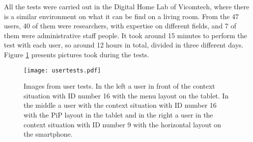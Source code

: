 All the tests were carried out in the Digital Home Lab of Vicomtech, where there is a similar environment on what it can be find on a living room. From the 47 users, 40 of them were researchers, with expertise on different fields, and 7 of them were administrative staff people. It took around 15 minutes to perform the test with each user, so around 12 hours in total, divided in three different days. Figure \ref{fig:usertestsBMSB15} presents pictures took during the tests.
\begin{figure}
	\centering
	\texttt{[image: usertests.pdf]}
	\caption[User tests images]{Images from user tests. In the left a user in front of the context situation with ID number 16 with the menu layout on the tablet. In the middle a user with the context situation with ID number 16 with the PiP layout in the tablet and in the right a user in the context situation with ID number 9 with the horizontal layout on the smartphone.}
	\label{fig:usertestsBMSB15}
\end{figure}
